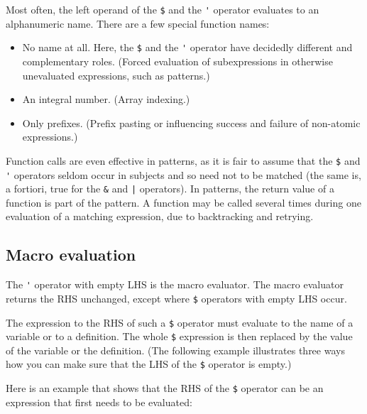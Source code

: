 \documentclass[12pt]{article}
\begin{document}
Most often, the left operand of the \verb|$| and the \verb|'| operator
evaluates to an alphanumeric name. There are a few special function
names:
\begin{itemize}
\item No name at all. Here, the \verb|$| and the \verb|'| operator
  have decidedly different and complementary roles. (Forced evaluation
  of subexpressions in otherwise unevaluated expressions, such as
  patterns.)
\item An integral number. (Array indexing.)
\item Only prefixes. (Prefix pasting or influencing success and
  failure of non-atomic expressions.)
\end{itemize}

Function calls are even effective in patterns, as it is fair to assume
that the \verb|$| and \verb|'| operators seldom occur in subjects and so need
not to be matched (the same is, a fortiori, true for the \verb|&| and
\verb,|, operators). In patterns, the return value of a function is
part of the pattern. A function may be called several times during one
evaluation of a matching expression, due to backtracking and retrying.

\subsection{Macro evaluation}

The \verb|'| operator with empty LHS is the macro evaluator. The macro evaluator
returns the RHS unchanged, except where \verb|$| operators with empty LHS occur.

The expression to the RHS of such a \verb|$| operator must evaluate to the name of a
variable or to a definition. The whole \verb|$| expression is then replaced by the
value of the variable or the definition. (The following example illustrates
three ways how you can make sure that the LHS of the \verb|$| operator is empty.)

Here is an example that shows that the RHS of the \verb|$| operator can be an
expression that first needs to be evaluated:
\end{document}
